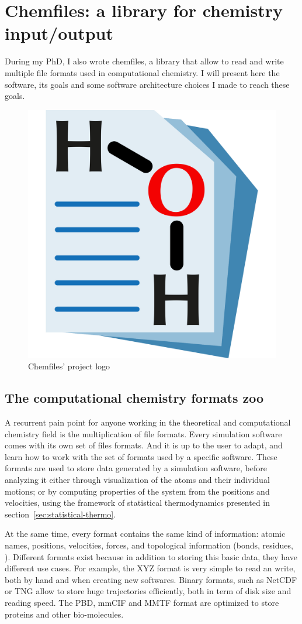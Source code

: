 \documentclass[thesis]{subfiles}
\begin{document}
\OnlyInSubfile{\appendix}
\chapter{Chemfiles: a library for chemistry input/output}
\label{sec:chemfiles}

During my PhD, I also wrote chemfiles, a library that allow to read and write
multiple file formats used in computational chemistry. I will present here the
software, its goals and some software architecture choices I made to reach these
goals.

\vfill
\begin{figure}[H]
    \centering
    \includegraphics[width=.3\textwidth]{figures/images/chemfiles-logo}
    \caption{Chemfiles' project logo}
    \label{fig:chemfiles:logo}
\end{figure}
\vfill

\newpage
\section{The computational chemistry formats zoo}

A recurrent pain point for anyone working in the theoretical and computational
chemistry field is the multiplication of file formats. Every simulation software
comes with its own set of files formats. And it is up to the user to adapt, and
learn how to work with the set of formats used by a specific software. These
formats are used to store data generated by a simulation software, before
analyzing it either through visualization of the atoms and their individual
motions; or by computing properties of the system from the positions and
velocities, using the framework of statistical thermodynamics presented in
section~\ref{sec:statistical-thermo}.

At the same time, every format contains the same kind of information: atomic
names, positions, velocities, forces, and topological information (bonds,
residues, \etc). Different formats exist because in addition to storing this
basic data, they have different use cases. For example, the XYZ format is very
simple to read an write, both by hand and when creating new softwares. Binary
formats, such as NetCDF or TNG allow to store huge trajectories efficiently,
both in term of disk size and reading speed. The PBD, mmCIF and MMTF format are
optimized to store proteins and other bio-molecules.
\end{document}
